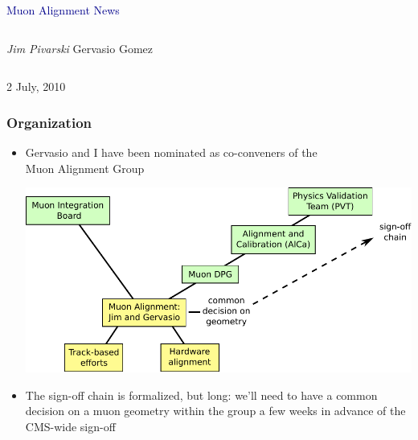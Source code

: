 \documentclass[compress]{beamer}
\begin{document}
\begin{frame}
\vfill
\begin{center}
\textcolor{darkblue}{\Large Muon Alignment News}

\vfill
\begin{columns}
\begin{center}
\large
{\it Jim Pivarski} \hspace{0.5 cm} Gervasio Gomez
\end{center}
\end{columns}

\vfill
 2 July, 2010

\end{center}
\end{frame}


\small

\begin{frame}
\frametitle{Organization}
\begin{itemize}\setlength{\itemsep}{0.75 cm}
\item Gervasio and I have been nominated as co-conveners of the \\ Muon Alignment Group

\includegraphics[width=\linewidth]{organization.pdf}

\item The sign-off chain is formalized, but long: we'll need to have a
  common decision on a muon geometry within the group a few weeks in
  advance of the CMS-wide sign-off
\end{itemize}
\end{frame}
\end{document}
